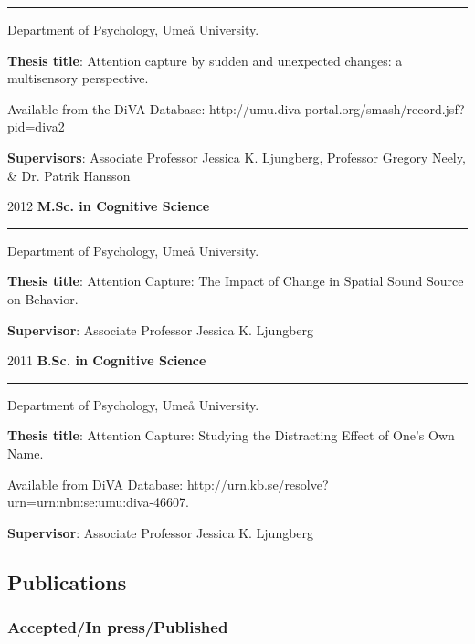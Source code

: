 \documentclass[]{article}
\begin{document}
\hrule

\begin{changemargin}{2.3cm}{2.4cm}

Department of Psychology, Umeå University.

\textbf{Thesis title}: Attention capture by sudden and unexpected changes: a multisensory perspective. 

Available from the DiVA Database: \sloppy http://umu.diva-portal.org/smash/record.jsf?pid=diva2%

\textbf{Supervisors}: Associate Professor Jessica K. Ljungberg, Professor Gregory Neely, \& Dr. Patrik Hansson
\end{changemargin}

2012 \hspace{1.5cm}\textbf{M.Sc. in Cognitive Science}\vspace{1mm}

\hrule
\begin{changemargin}{2.3cm}{2.4cm}

Department of Psychology, Umeå University.

\textbf{Thesis title}: Attention Capture: The Impact of Change in Spatial Sound Source on Behavior. 
    
\textbf{Supervisor}: Associate Professor Jessica K. Ljungberg
\end{changemargin}

2011 \hspace{1.5cm}\textbf{B.Sc. in Cognitive Science}\vspace{1mm}

\hrule

\begin{changemargin}{2.3cm}{2.4cm}

Department of Psychology, Umeå University.

\textbf{Thesis title}:  Attention Capture: Studying the Distracting Effect of One’s Own Name.

Available from DiVA Database: \sloppy http://urn.kb.se/resolve?urn=urn:nbn:se:umu:diva-46607.
    
\textbf{Supervisor}: Associate Professor Jessica K. Ljungberg
\end{changemargin}

\subsection{Publications}\label{publications}

\subsubsection{Accepted/In
press/Published}\label{acceptedin-presspublished}
\end{document}
